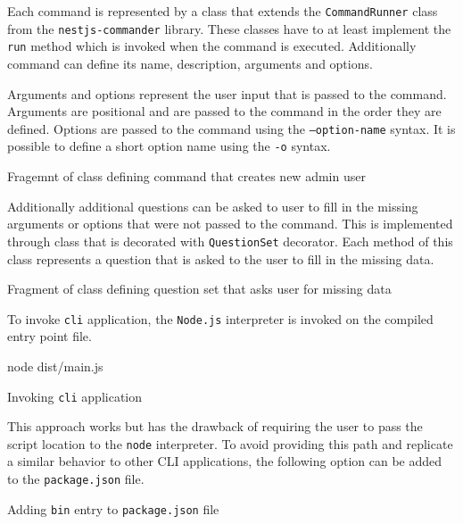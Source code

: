 \documentclass[../main.tex]{subfiles}
\begin{document}
Each command is represented by a class that extends the \texttt{CommandRunner} class from the \texttt{nestjs-commander} library.
These classes have to at least implement the \texttt{run} method which is invoked when the command is executed.
Additionally command can define its name, description, arguments and options.

Arguments and options represent the user input that is passed to the command.
Arguments are positional and are passed to the command in the order they are defined.
Options are passed to the command using the \texttt{--option-name} syntax.
It is possible to define a short option name using the \texttt{-o} syntax.

\begin{listing}[H]
  \caption{Fragemnt of class defining command that creates new admin user}
\end{listing}

Additionally additional questions can be asked to user to fill in the missing arguments or options that were not passed to the command.
This is implemented through class that is decorated with \texttt{QuestionSet} decorator. Each method of this class represents a question that is asked to the user to fill in the missing data.

\begin{listing}[H]
  \caption{Fragment of class defining question set that asks user for missing data}
\end{listing}

To invoke \texttt{cli} application, the \texttt{Node.js} interpreter is invoked on the compiled entry point file.

\begin{listing}[H]
  \begin{bashcode}
    node dist/main.js
  \end{bashcode}
  \caption{Invoking \texttt{cli} application}
\end{listing}

This approach works but has the drawback of requiring the user to pass the script location to the \texttt{node} interpreter.
To avoid providing this path and replicate a similar behavior to other CLI applications, the following option can be added to the \texttt{package.json} file.

\begin{listing}[H]
  \caption{Adding \texttt{bin} entry to \texttt{package.json} file}
\end{listing}
\end{document}
